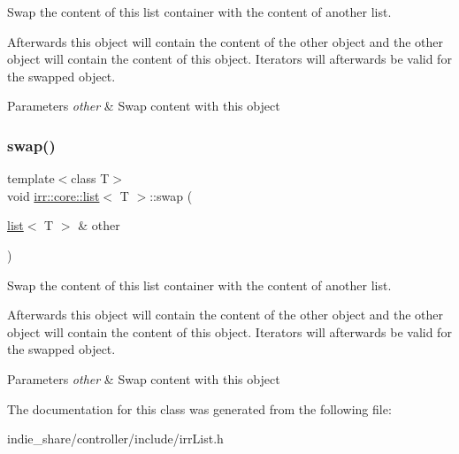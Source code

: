Swap the content of this list container with the content of another list. 

Afterwards this object will contain the content of the other object and the other object will contain the content of this object. Iterators will afterwards be valid for the swapped object. 
\begin{DoxyParams}{Parameters}
{\em other} & Swap content with this object \\
\hline
\end{DoxyParams}
\mbox{\label{classirr_1_1core_1_1list_a860e4dab70f2ac5f13b9385f7f63d5b9}} 
\subsubsection{\texorpdfstring{swap()}{swap()}\hspace{0.1cm}{\footnotesize\ttfamily [2/2]}}
{\footnotesize\ttfamily template$<$class T$>$ \\
void \hyperlink{classirr_1_1core_1_1list}{irr\+::core\+::list}$<$ T $>$\+::swap (\begin{DoxyParamCaption}\item[{\hyperlink{classirr_1_1core_1_1list}{list}$<$ T $>$ \&}]{other }\end{DoxyParamCaption})\hspace{0.3cm}{\ttfamily [inline]}}



Swap the content of this list container with the content of another list. 

Afterwards this object will contain the content of the other object and the other object will contain the content of this object. Iterators will afterwards be valid for the swapped object. 
\begin{DoxyParams}{Parameters}
{\em other} & Swap content with this object \\
\hline
\end{DoxyParams}


The documentation for this class was generated from the following file\+:\begin{DoxyCompactItemize}
\item 
indie\+\_\+share/controller/include/irr\+List.\+h\end{DoxyCompactItemize}
